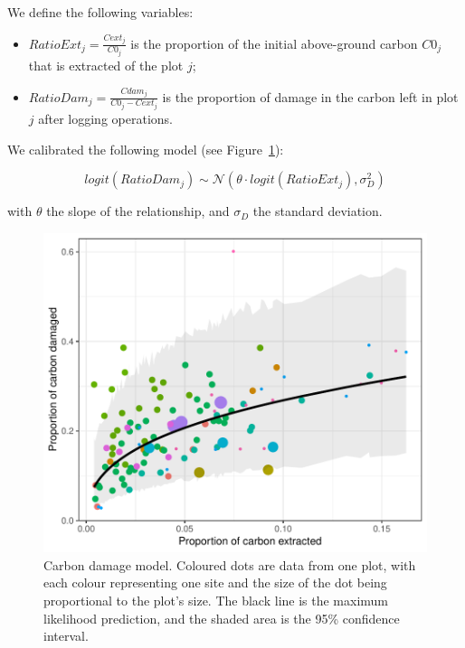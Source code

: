 \documentclass{article}
\begin{document}
We define the following variables: 

\begin{itemize}
    \item $RatioExt_j=\frac{Cext_j}{C0_j}$ is the proportion of the initial above-ground carbon $C0_j$ that is extracted of the plot $j$; 
    \item $RatioDam_j = \frac{Cdam_j}{C0_j-Cext_j}$ is the proportion of damage in the carbon left in plot $j$ after logging operations. 
\end{itemize}

We calibrated the following model (see Figure~\ref{fig:damModel}): 

\begin{equation}
logit(RatioDam_j) \sim \mathcal{N}(\theta \cdot logit(RatioExt_j), \sigma_D^2)
\end{equation} 

with $\theta$ the slope of the relationship, and $\sigma_D$ the standard deviation. 

\begin{figure}
    \centering
    \includegraphics[width=\linewidth]{graphs/damModel.pdf}
    \caption{Carbon damage model. Coloured dots are data from one plot, with each colour representing one site and the size of the dot being proportional to the plot's size. The black line is the maximum likelihood prediction, and the shaded area is the 95\% confidence interval.}
    \label{fig:damModel}
\end{figure}
\end{document}
